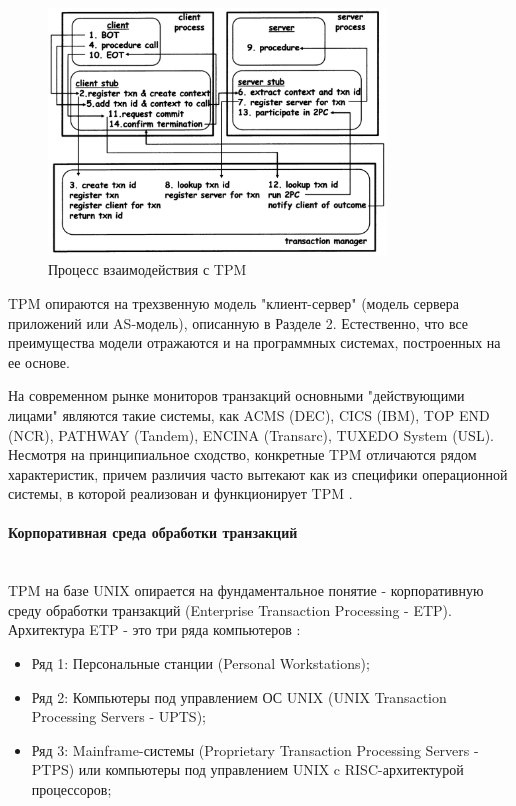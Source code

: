 \begin{figure}[h!]
    \centering
    \includegraphics[width=0.8\textwidth]{assets/distributed/TPM_arch.png}
    \caption{Процесс взаимодействия с TPM}
	\label{tpm_process}
\end{figure}

TPM опираются на трехзвенную модель "клиент-сервер" (модель сервера приложений или AS-модель), описанную в Разделе 2.
Естественно, что все преимущества модели отражаются и на программных системах, построенных на ее основе.

На современном рынке мониторов транзакций основными "действующими лицами" являются такие системы,
как ACMS (DEC), CICS (IBM), TOP END (NCR), PATHWAY (Tandem), ENCINA (Transarc), TUXEDO System (USL).
Несмотря на принципиальное сходство, конкретные TPM отличаются рядом характеристик, причем
различия часто вытекают как из специфики операционной системы, в которой реализован и функционирует TPM \autocite{TransactionMonitors}.

\paragraph{Корпоративная среда обработки транзакций}~\\

TPM на базе UNIX опирается на фундаментальное понятие - корпоративную среду обработки транзакций
(Enterprise Transaction Processing - ETP). Архитектура ETP - это три ряда компьютеров \autocite{TransactionMonitors}:
\begin{itemize}
    \item Ряд 1: Персональные станции (Personal Workstations);
    \item Ряд 2: Компьютеры под управлением ОС UNIX (UNIX Transaction Processing Servers - UPTS);
    \item Ряд 3: Mainframe-системы (Proprietary Transaction Processing Servers - PTPS)
    или компьютеры под управлением UNIX c RISC-архитектурой процессоров;
\end{itemize}

